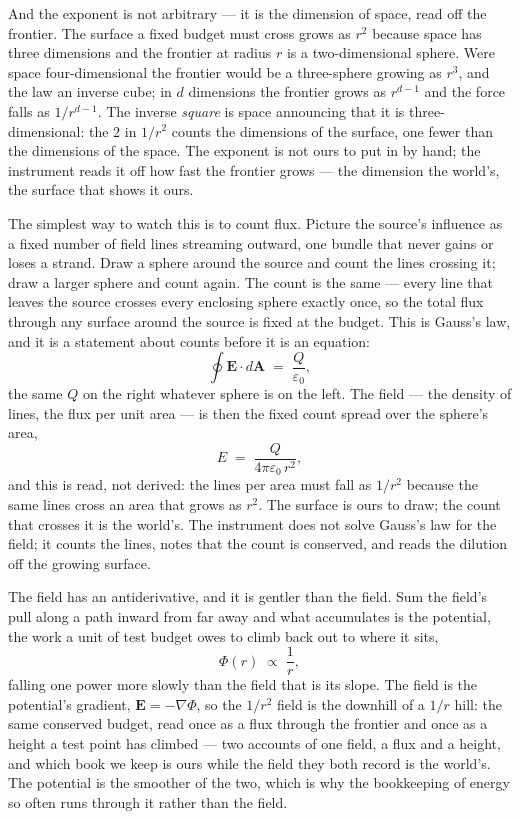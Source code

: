 And the exponent is not arbitrary --- it is the dimension of space, read off the frontier. The surface a fixed
budget must cross grows as $r^2$ because space has three dimensions and the frontier at radius $r$ is a
two-dimensional sphere. Were space four-dimensional the frontier would be a three-sphere growing as $r^3$, and
the law an inverse cube; in $d$ dimensions the frontier grows as $r^{d-1}$ and the force falls as $1/r^{d-1}$.
The inverse \emph{square} is space announcing that it is three-dimensional: the $2$ in $1/r^2$ counts the
dimensions of the surface, one fewer than the dimensions of the space. The exponent is not ours to put
in by hand; the instrument reads it off how fast the frontier grows --- the dimension the world's, the surface
that shows it ours.

The simplest way to watch this is to count flux. Picture the source's influence as a fixed number of field
lines streaming outward, one bundle that never gains or loses a strand. Draw a sphere around the source and
count the lines crossing it; draw a larger sphere and count again. The count is the same --- every line that
leaves the source crosses every enclosing sphere exactly once, so the total flux through any surface around
the source is fixed at the budget. This is Gauss's law, and it is a statement about counts before it is an
equation:
\begin{equation}
  \oint \mathbf{E}\cdot d\mathbf{A} \;=\; \frac{Q}{\varepsilon_0},
\end{equation}
the same $Q$ on the right whatever sphere is on the left. The field --- the density of lines, the flux per
unit area --- is then the fixed count spread over the sphere's area,
\begin{equation}
  E \;=\; \frac{Q}{4\pi\varepsilon_0\, r^2},
\end{equation}
and this is read, not derived: the lines per area must fall as $1/r^2$ because the same lines cross an area
that grows as $r^2$. The surface is ours to draw; the count that crosses it is the world's. The instrument does
not solve Gauss's law for the field; it counts the lines, notes that the count is conserved, and reads the
dilution off the growing surface.

The field has an antiderivative, and it is gentler than the field. Sum the field's pull along a path inward
from far away and what accumulates is the potential, the work a unit of test budget owes to climb back out to
where it sits,
\begin{equation}
  \Phi(r) \;\propto\; \frac{1}{r},
\end{equation}
falling one power more slowly than the field that is its slope. The field is the potential's gradient,
$\mathbf{E} = -\nabla\Phi$, so the $1/r^2$ field is the downhill of a $1/r$ hill: the same conserved budget,
read once as a flux through the frontier and once as a height a test point has climbed --- two accounts of
one field, a flux and a height, and which book we keep is ours while the field they both record is the world's.
The potential is the smoother of the two, which is why the bookkeeping of energy so often runs through it
rather than the field.

